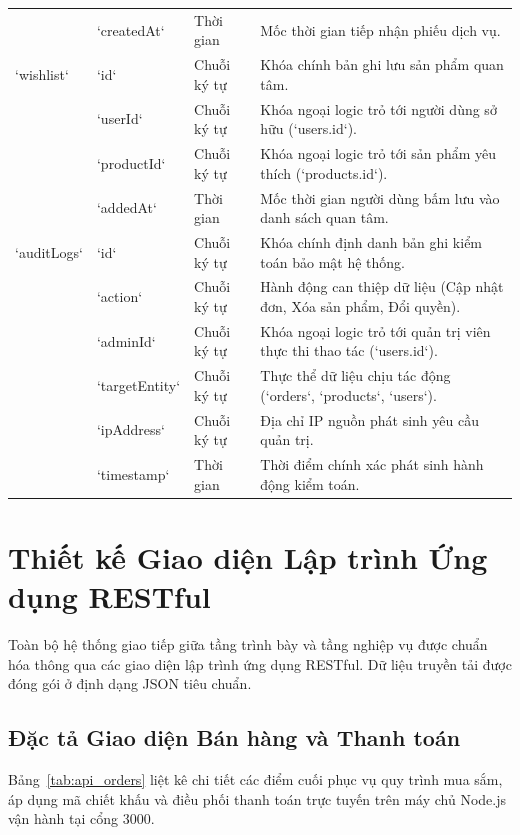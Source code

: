 \begin{table}[H]
\begin{tabularx}{\textwidth}{p{2.5cm}p{2.3cm}p{1.8cm}X}
& `createdAt` & Thời gian & Mốc thời gian tiếp nhận phiếu dịch vụ. \\
\addlinespace
`wishlist` & `id` & Chuỗi ký tự & Khóa chính bản ghi lưu sản phẩm quan tâm. \\
& `userId` & Chuỗi ký tự & Khóa ngoại logic trỏ tới người dùng sở hữu (`users.id`). \\
& `productId` & Chuỗi ký tự & Khóa ngoại logic trỏ tới sản phẩm yêu thích (`products.id`). \\
& `addedAt` & Thời gian & Mốc thời gian người dùng bấm lưu vào danh sách quan tâm. \\
\addlinespace
`auditLogs` & `id` & Chuỗi ký tự & Khóa chính định danh bản ghi kiểm toán bảo mật hệ thống. \\
& `action` & Chuỗi ký tự & Hành động can thiệp dữ liệu (Cập nhật đơn, Xóa sản phẩm, Đổi quyền). \\
& `adminId` & Chuỗi ký tự & Khóa ngoại logic trỏ tới quản trị viên thực thi thao tác (`users.id`). \\
& `targetEntity`& Chuỗi ký tự & Thực thể dữ liệu chịu tác động (`orders`, `products`, `users`). \\
& `ipAddress` & Chuỗi ký tự & Địa chỉ IP nguồn phát sinh yêu cầu quản trị. \\
& `timestamp` & Thời gian & Thời điểm chính xác phát sinh hành động kiểm toán. \\
\bottomrule
\end{tabularx}
\end{table}

\section{Thiết kế Giao diện Lập trình Ứng dụng RESTful}
Toàn bộ hệ thống giao tiếp giữa tầng trình bày và tầng nghiệp vụ được chuẩn hóa thông qua các giao diện lập trình ứng dụng RESTful. Dữ liệu truyền tải được đóng gói ở định dạng JSON tiêu chuẩn.

\subsection{Đặc tả Giao diện Bán hàng và Thanh toán}
Bảng~\ref{tab:api_orders} liệt kê chi tiết các điểm cuối phục vụ quy trình mua sắm, áp dụng mã chiết khấu và điều phối thanh toán trực tuyến trên máy chủ Node.js vận hành tại cổng 3000.

